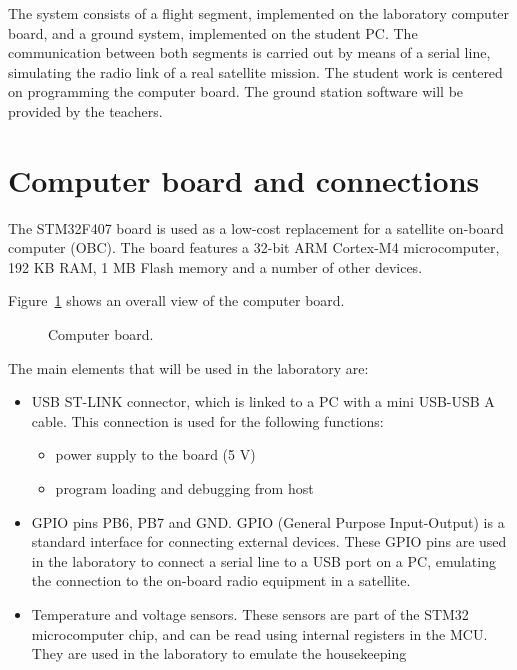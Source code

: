 The system consists of a flight segment, implemented on the laboratory computer board, and a ground system, implemented on the student PC. The communication between both segments is carried out by means of a serial line, simulating the radio link of a real satellite mission.
The student work is centered on programming the computer board. The ground station software will be provided by the teachers.

\section*{Computer board and connections}

The STM32F407 board is used as a low-cost replacement for a satellite on-board computer (OBC). The board features a 32-bit ARM Cortex-M4 microcomputer, 192 KB RAM, 1 MB Flash memory and a number of other devices.

Figure~\ref{fig:board} shows an overall view of the computer board.

\begin{figure}[h]
            \caption{Computer board.}
            \label{fig:board}
\end{figure}

The main elements that will be used in the laboratory are:
\begin{itemize}
\item	USB ST-LINK connector, which is linked to a PC with a mini USB-USB A cable. This connection is used for the following functions:
\begin{itemize}
\item	power supply to the board (5 V)
\item	program loading and debugging from host
\end{itemize}
\item	GPIO pins PB6, PB7 and GND. GPIO (General Purpose Input-Output) is a standard interface for connecting external devices. These GPIO pins are used in the laboratory to connect a serial line to a USB port on a PC, emulating the connection to the on-board radio equipment in a satellite.
\item	Temperature and voltage sensors. These sensors are part of the STM32 microcomputer chip, and can be read using internal registers in the MCU. They are used in the laboratory to emulate the housekeeping 
\end{itemize}
